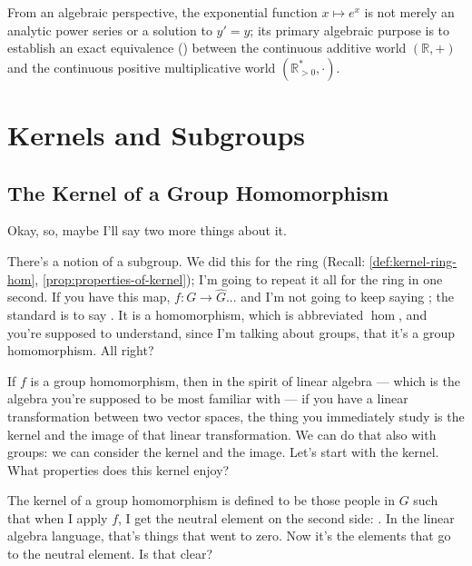 \begin{insight}
From an algebraic perspective, the exponential function $x \mapsto e^x$ is not merely an analytic power series or a solution to $y' = y$; its primary algebraic purpose is to establish an exact equivalence () between the continuous additive world $(\mathbb{R}, +)$ and the continuous positive multiplicative world $(\mathbb{R}^*_{>0}, \cdot)$.
\end{insight}

\begin{hidden}
\end{hidden}

\section{Kernels and Subgroups}

\subsection{The Kernel of a Group Homomorphism}

\begin{speech}[00:19:27 - 00:20:55]
Okay, so, maybe I'll say two more things about it.

There's a notion of a subgroup. We did this for the ring (Recall: \cref{def:kernel-ring-hom}, \cref{prop:properties-of-kernel}); I'm going to repeat it all for the ring in one second. If you have this map, $f \colon G \to \hat{G}$... and I'm not going to keep saying ; the standard is to say . It is a homomorphism, which is abbreviated $\operatorname{hom}$,  and you're supposed to understand, since I'm talking about groups, that it's a group homomorphism. All right?

If $f$ is a group homomorphism, then in the spirit of linear algebra --- which is the algebra you're supposed to be most familiar with --- if you have a linear transformation between two vector spaces, the thing you immediately study is the kernel and the image of that linear transformation. We can do that also with groups: we can consider the kernel and the image.  Let's start with the kernel. What properties does this kernel enjoy?

The kernel of a group homomorphism is defined to be those people in $G$ such that when I apply $f$, I get the neutral element on the second side: . In the linear algebra language, that's things that went to zero. Now it's the elements that go to the neutral element. Is that clear?
\end{speech}

